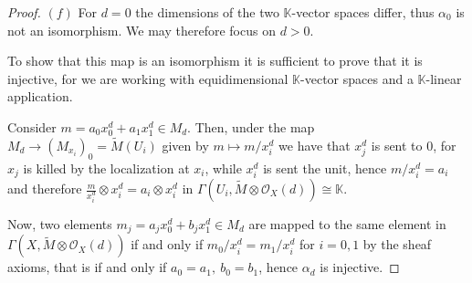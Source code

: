 \documentclass{article}
\newcommand{\numberset}{\mathbb}
\newcommand{\K}{\numberset{K}}
\begin{document}
\begin{proof}
    $(f)$ For $d=0$ the dimensions of the two $\K$-vector spaces differ, thus
    $\alpha_0$ is not an isomorphism. We may therefore focus on $d>0$.

    To show that this map is an isomorphism it is sufficient to prove that it is
    injective, for we are working with equidimensional $\K$-vector spaces and a
    $\K$-linear application.

    Consider $m=a_0x_0^d+a_1x_1^d\in M_d$. Then, under the map $M_d\rightarrow
    (M_{x_i})_0=\tilde{M}(U_i)$ given by $m\mapsto m/x_i^d$ we have that $x_j^d$
    is sent to 0, for $x_j$ is killed by the localization at $x_i$, while
    $x_i^d$ is sent the unit, hence $m/x_i^d=a_i$ and therefore
    $\frac{m}{x_i^d}\otimes x_i^d=a_i\otimes x_i^d$ in
    $\Gamma(U_i,\tilde{M}\otimes\mathcal{O}_X(d))\cong\K$.

    Now, two elements $m_j=a_jx_0^d+b_jx_1^d\in M_d$ are
    mapped to the same element in $\Gamma(X,\tilde{M}\otimes\mathcal{O}_X(d))$
    if and only if $m_0/x_i^d=m_1/x_i^d$ for $i=0,1$ by the sheaf axioms, that
    is if and only if $a_0=a_1,\ b_0=b_1$, hence $\alpha_d$ is injective.
\end{proof}





\printbibliography
\end{document}
